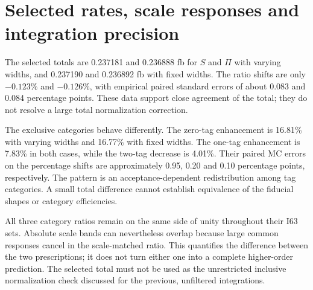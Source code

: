 \documentclass[11pt,a4paper]{article}
\begin{document}
\section{Selected rates, scale responses and integration precision}
\begin{table}[htbp]\centering\small
\resizebox{\linewidth}{!}{}
\caption{Equal-weight mean cross sections in fb, with propagated native
MC errors. The baseline is the generation-selected total; the three
exclusive tag categories partition it.}
\label{tab:rates}
\end{table}
The selected totals are 0.237181 and 0.236888 fb for $S$ and $\Pi$ with
varying widths, and 0.237190 and 0.236892 fb with fixed widths.
The ratio shifts are only $-0.123$\% and $-0.126$\%, with empirical
paired standard errors of about 0.083 and 0.084 percentage points.
These data support close agreement of the total; they do not resolve a
large total normalization correction.

The exclusive categories behave differently. The zero-tag enhancement
is 16.81\% with varying widths and 16.77\% with fixed widths. The
one-tag enhancement is 7.83\% in both cases, while the two-tag
decrease is 4.01\%. Their paired MC errors on the percentage shifts
are approximately 0.95, 0.20 and 0.10 percentage points, respectively.
The pattern is an acceptance-dependent redistribution among tag
categories. A small total difference cannot establish equivalence of
the fiducial shapes or category efficiencies.

\begin{table}[htbp]\centering\small
\resizebox{\linewidth}{!}{}
\caption{Central percentage shifts $100(\Pi/S-1)$, paired statistical
errors on the dimensionless ratio, and scale-matched ratio envelopes.
Only the first row of each width block is expressed in percent.}
\label{tab:ratios}
\end{table}
All three category ratios remain on the same side of unity throughout
their I63 sets. Absolute scale bands can nevertheless overlap because
large common responses cancel in the scale-matched ratio. This
quantifies the difference between the two prescriptions; it does not
turn either one into a complete higher-order prediction. The selected
total must not be used as the unrestricted inclusive normalization
check discussed for the previous, unfiltered integrations.
\end{document}
